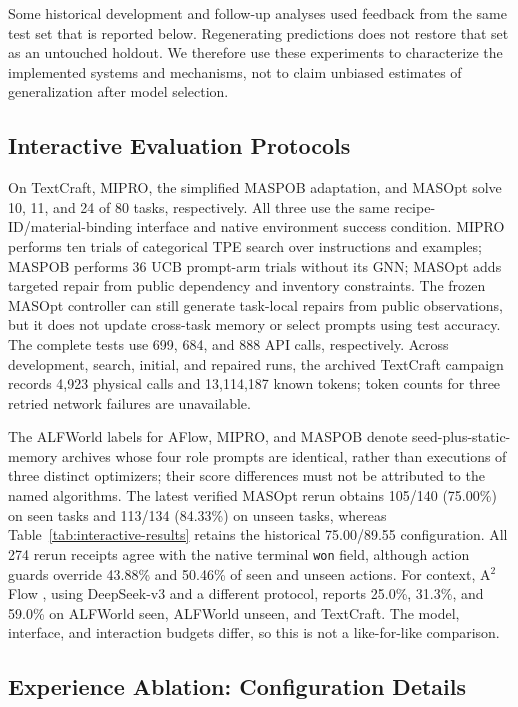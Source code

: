 Some historical development and follow-up analyses used feedback from the same test set that is reported below. Regenerating predictions does not restore that set as an untouched holdout. We therefore use these experiments to characterize the implemented systems and mechanisms, not to claim unbiased estimates of generalization after model selection.

\subsection{Interactive Evaluation Protocols}
\label{app:interactive-protocols}

On TextCraft, MIPRO, the simplified MASPOB adaptation, and MASOpt solve 10, 11, and 24 of 80 tasks, respectively. All three use the same recipe-ID/material-binding interface and native environment success condition. MIPRO performs ten trials of categorical TPE search over instructions and examples; MASPOB performs 36 UCB prompt-arm trials without its GNN; MASOpt adds targeted repair from public dependency and inventory constraints. The frozen MASOpt controller can still generate task-local repairs from public observations, but it does not update cross-task memory or select prompts using test accuracy. The complete tests use 699, 684, and 888 API calls, respectively. Across development, search, initial, and repaired runs, the archived TextCraft campaign records 4,923 physical calls and 13,114,187 known tokens; token counts for three retried network failures are unavailable.

The ALFWorld labels for AFlow, MIPRO, and MASPOB denote seed-plus-static-memory archives whose four role prompts are identical, rather than executions of three distinct optimizers; their score differences must not be attributed to the named algorithms. The latest verified MASOpt rerun obtains 105/140 (75.00\%) on seen tasks and 113/134 (84.33\%) on unseen tasks, whereas Table~\ref{tab:interactive-results} retains the historical 75.00/89.55 configuration. All 274 rerun receipts agree with the native terminal \texttt{won} field, although action guards override 43.88\% and 50.46\% of seen and unseen actions. For context, A$^2$Flow \citep{zhao2025a2flow}, using DeepSeek-v3 and a different protocol, reports 25.0\%, 31.3\%, and 59.0\% on ALFWorld seen, ALFWorld unseen, and TextCraft. The model, interface, and interaction budgets differ, so this is not a like-for-like comparison.

\subsection{Experience Ablation: Configuration Details}
\label{app:experience-details}

